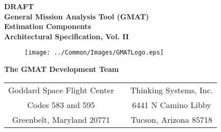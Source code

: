 \thispagestyle{empty}
\begin{center}
{\renewcommand{\thefootnote}{\fnsymbol{footnote}} { \huge \bf DRAFT
\\General Mission Analysis Tool (GMAT)\\ Estimation Components\\
Architectural Specification, Vol. II\\}
\vspace{0.1in} }
\end{center}

\begin{figure}[htbp!]
    \begin{center}
    \texttt{[image: ../Common/Images/GMATLogo.eps]}
    \end{center}
\end{figure}

\begin{center}
{\Large \bf The GMAT Development Team}\\
\vspace{0.1in}
\begin{tabular}{c c c}
  Goddard Space Flight Center & & Thinking Systems, Inc. \\
  Codes 583 and 595 & \hspace{0.3in} & 6441 N Camino Libby \\
  Greenbelt, Maryland 20771 & & Tucson, Arizona 85718 \\
\end{tabular}

\vspace{0.1in}{\today}

\end{center}

\clearpage \clearpage
